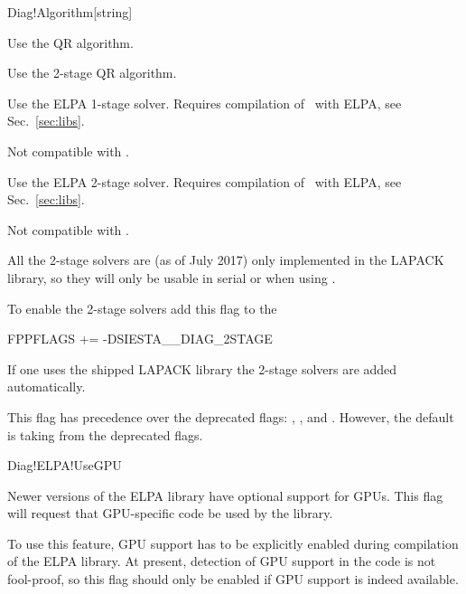 \begin{fdfentry}{Diag!Algorithm}[string]
\begin{fdfoptions}
    Use the QR algorithm.


    Use the 2-stage QR algorithm.

    
    
    Use the ELPA\cite{ELPA,ELPA-1} 1-stage solver. Requires
    compilation of \siesta\ with ELPA, see Sec.~\ref{sec:libs}.

    Not compatible with .

    
    Use the ELPA\cite{ELPA,ELPA-1} 2-stage solver. Requires
    compilation of \siesta\ with ELPA, see Sec.~\ref{sec:libs}.

    Not compatible with .

  \end{fdfoptions}

  \note All the 2-stage solvers are (as of July 2017) only
  implemented in the LAPACK library, so they will only be usable in
  serial or when using .

  To enable the 2-stage solvers add this flag to the 
  \begin{shellexample}
    FPPFLAGS += -DSIESTA__DIAG_2STAGE
  \end{shellexample}

  If one uses the shipped LAPACK library the 2-stage solvers are added
  automatically.


  \note This flag has precedence over the deprecated flags:
  , ,  and
  . However, the default is taking from the
  deprecated flags.
  
\end{fdfentry}

\begin{fdflogicalF}{Diag!ELPA!UseGPU}

  Newer versions of the ELPA library have optional support for GPUs. 
  This flag will request that GPU-specific code be used by the
  library.

  To use this feature, GPU support has to be explicitly enabled during
  compilation of the ELPA library. At present, detection of GPU
  support in the code is not fool-proof, so this flag should only be
  enabled if GPU support is indeed available.

\end{fdflogicalF}

